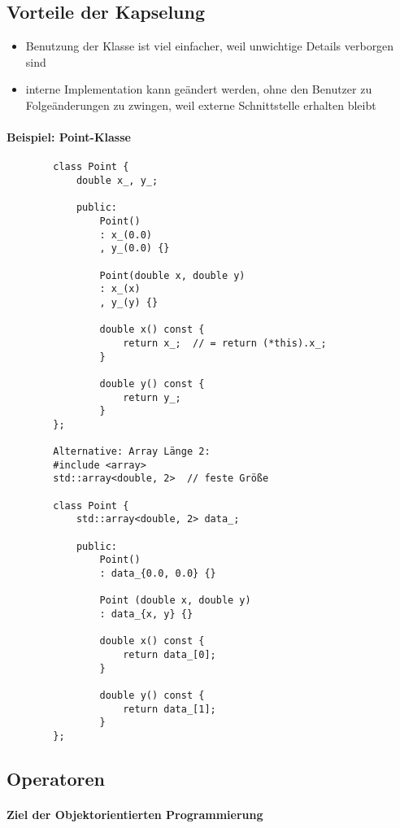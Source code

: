 \documentclass{article}
\begin{document}
\subsection{Vorteile der Kapselung}
	\begin{itemize}
		\item Benutzung der Klasse ist viel einfacher, weil unwichtige Details verborgen sind
		\item interne Implementation kann geändert werden, ohne den Benutzer zu Folgeänderungen zu zwingen, weil externe Schnittstelle erhalten bleibt
	\end{itemize}
\paragraph{Beispiel: Point-Klasse}
	\begin{lstlisting}
		class Point {
		    double x_, y_;

		    public:
		 		Point()
		 		: x_(0.0)
		 		, y_(0.0) {} 

		 		Point(double x, double y)
		 		: x_(x)
		 		, y_(y) {}

		 		double x() const {
		 			return x_;  // = return (*this).x_;
		 		}

		 		double y() const {
		 			return y_;
		 		}
		};

		Alternative: Array Länge 2:
		#include <array>
		std::array<double, 2>  // feste Größe

		class Point {
		    std::array<double, 2> data_;

		    public:
		    	Point()
		    	: data_{0.0, 0.0} {}

		    	Point (double x, double y)
		    	: data_{x, y} {}

		    	double x() const {
		    		return data_[0];
		    	}

		    	double y() const {
		    		return data_[1];
		    	}
		};
	\end{lstlisting}

\subsection{Operatoren}
\paragraph{Ziel der Objektorientierten Programmierung}
\end{document}
